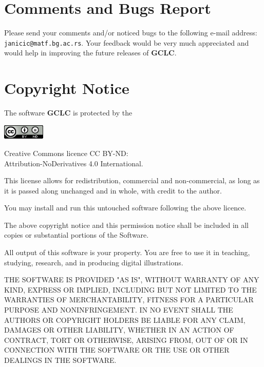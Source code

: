 \documentclass[a4paper]{book}
\newcommand{\gclc}{{\bfseries GCLC}\xspace}
\begin{document}
\section{Comments and Bugs Report}

Please send your comments and/or noticed bugs to the following
e-mail address: \verb|janicic@matf.bg.ac.rs|. Your feedback would
be very much appreciated and would help in improving the future
releases of \gclc.


\section{Copyright Notice}

The software \gclc is protected by the

\begin{center}
\includegraphics[width=0.15\textwidth]{figures/CC-BY-ND.png}
\begin{minipage}{8cm}
Creative Commons licence  CC BY-ND: \\ Attribution-NoDerivatives 4.0 International.   
\end{minipage}
\end{center}

\noindent
This license allows for redistribution, commercial and non-commercial, 
as long as it is passed along unchanged and in whole, with credit to 
the author. 

You may install and run this untouched software following the 
above licence.

The above copyright notice and this permission notice shall be 
included in all copies or substantial portions of the Software.

All output of this software is your property. You are free to
use it in teaching, studying, research, and in producing digital
illustrations.

THE SOFTWARE IS PROVIDED "AS IS", WITHOUT WARRANTY OF ANY KIND, EXPRESS OR
IMPLIED, INCLUDING BUT NOT LIMITED TO THE WARRANTIES OF MERCHANTABILITY,
FITNESS FOR A PARTICULAR PURPOSE AND NONINFRINGEMENT. IN NO EVENT SHALL THE
AUTHORS OR COPYRIGHT HOLDERS BE LIABLE FOR ANY CLAIM, DAMAGES OR OTHER
LIABILITY, WHETHER IN AN ACTION OF CONTRACT, TORT OR OTHERWISE, ARISING FROM,
OUT OF OR IN CONNECTION WITH THE SOFTWARE OR THE USE OR OTHER DEALINGS IN THE
SOFTWARE.
\end{document}
